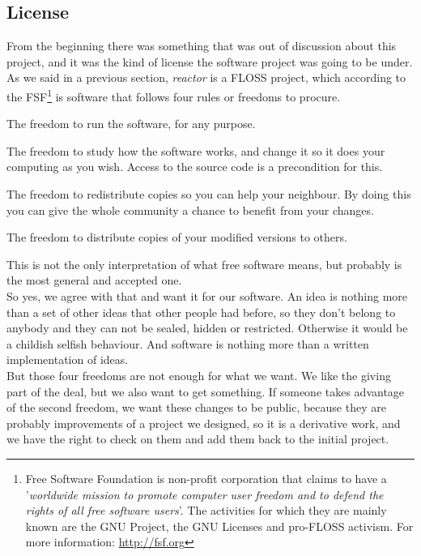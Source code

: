 \subsection{License}
From the beginning there was something that was out of discussion about this project, and it was the kind of license the software project
was going to be under. As we said in a previous section, \emph{reactor} is a FLOSS project, which according to the FSF\footnote{Free 
Software Foundation is non-profit corporation that claims to have a '\emph{worldwide mission to promote computer user freedom and to defend 
the rights of all free software users}'. The activities for which they are mainly known are the GNU Project, the GNU Licenses and 
pro-FLOSS activism\cite{fsf}. For more information: \url{http://fsf.org}} is software that follows four rules or freedoms to procure.
\begin{list}{-}{These freedoms are\cite{fsf}:}
  \item The freedom to run the software, for any purpose.
  \item The freedom to study how the software works, and change it so it does your computing as you wish.
    \subitem Access to the source code is a precondition for this. 
  \item The freedom to redistribute copies so you can help your neighbour.
    \subitem By doing this you can give the whole community a chance to benefit from your changes. 
  \item The freedom to distribute copies of your modified versions to others.
\end{list}
This is not the only interpretation of what free software means, but probably is the most general and accepted one.\\
So yes, we agree with that and want it for our software. An idea is nothing more than a set of other ideas that other people had before,
so they don't belong to anybody and they can not be sealed, hidden or restricted. Otherwise it would be a childish selfish behaviour. And 
software is nothing more than a written implementation of ideas.\\
But those four freedoms are not enough for what we want. We like the giving part of the deal, but we also want to get something. If 
someone takes advantage of the second freedom, we want these changes to be public, because they are probably improvements of a project
we designed, so it is a derivative work, and we have the right to check on them and add them back to the initial project.\\

